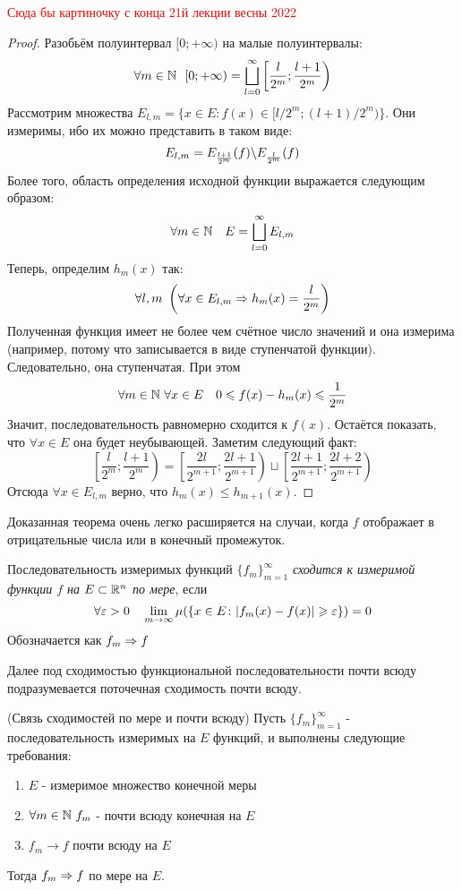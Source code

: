 \textcolor{red}{Сюда бы картиночку с конца 21й лекции весны 2022}

\begin{proof}
	Разобьём полуинтервал $[0; +\infty)$ на малые полуинтервалы:
	\[
		\forall m \in \N\ \ [0; +\infty) = \bscup_{l = 0}^\infty \left[\frac{l}{2^m}; \frac{l + 1}{2^m}\right)
	\]
	Рассмотрим множества $E_{l, m} = \{x \in E \colon f(x) \in [l / 2^m; (l + 1) / 2^m)\}$. Они измеримы, ибо их можно представить в таком виде:
	\[
		E_{l, m} = E_{\frac{l + 1}{2^m}}(f) \backslash E_{\frac{l}{2^m}}(f)
	\]
	Более того, область определения исходной функции выражается следующим образом:
	\[
		\forall m \in \mathbb{N} \quad E = \bigsqcup_{l = 0}^\infty E_{l, m}
	\]
	Теперь, определим $h_m(x)$ так:
	\[
		\forall l, m\ \left(\forall x \in E_{l, m} \Rightarrow h_m(x) = \frac{l}{2^m}\right)
	\]
	Полученная функция имеет не более чем счётное число значений и она измерима (например, потому что записывается в виде ступенчатой функции). Следовательно, она ступенчатая. При этом
	\[
		\forall m \in \N\ \forall x \in E \quad 0 \le f(x) - h_m(x) \le \frac{1}{2^m}
	\]
	Значит, последовательность равномерно сходится к $f(x)$. Остаётся показать, что $\forall x \in E$ она будет неубывающей. Заметим следующий факт:
	\[
		\left[\frac{l}{2^m}; \frac{l + 1}{2^m}\right) = \left[\frac{2l}{2^{m + 1}}; \frac{2l + 1}{2^{m + 1}}\right) \sqcup \left[\frac{2l + 1}{2^{m + 1}}; \frac{2l + 2}{2^{m + 1}}\right)
	\]
	Отсюда $\forall x \in E_{l, m}$ верно, что $h_m(x) \le h_{m + 1}(x)$.
\end{proof}

\begin{note}
	Доказанная теорема очень легко расширяется на случаи, когда $f$ отображает в отрицательные числа или в конечный промежуток.
\end{note}

\begin{definition}
	Последовательность измеримых функций $\{f_m\}_{m = 1}^\infty$ \textit{сходится к измеримой функции $f$ на $E \subset \mathbb{R}^n$ по мере}, если
	\[
		\forall \varepsilon > 0 \quad \lim_{m \to \infty} \mu(\{x \in E \colon |f_m(x) - f(x)| \geqslant \varepsilon\}) = 0
	\]
	Обозначается как $f_m \Rightarrow f$
\end{definition}

\begin{note}
	Далее под сходимостью функциональной последовательности почти всюду подразумевается поточечная сходимость почти всюду.
\end{note}

\begin{theorem} (Связь сходимостей по мере и почти всюду) \label{th2}
	Пусть $\{f_m\}_{m = 1}^\infty$ - последовательность измеримых на $E$ функций, и выполнены следующие требования:
	\begin{enumerate}
		\item $E$ - измеримое множество конечной меры
		
		\item $\forall m \in \mathbb{N}\ f_m$ - почти всюду конечная на $E$
		
		\item $f_m \to f$ почти всюду на $E$
	\end{enumerate}
	Тогда $f_m \Rightarrow f$ по мере на $E$.
\end{theorem}

